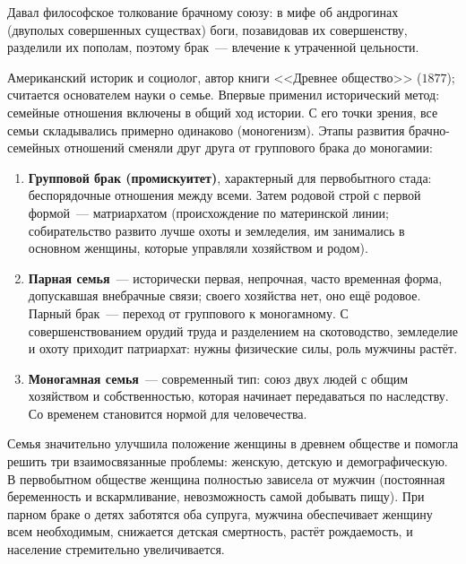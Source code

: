 \documentclass[12pt]{article}
\begin{document}
	\begin{person}[Платон]
		Давал философское толкование брачному союзу: в мифе об андрогинах (двуполых совершенных существах) боги, позавидовав их совершенству, разделили их пополам, поэтому брак~--- влечение к утраченной цельности.
	\end{person}

	\begin{person}
		Американский историк и социолог, автор книги <<Древнее общество>> ($1877$); считается основателем науки о семье. Впервые применил исторический метод: семейные отношения включены в общий ход истории. С его точки зрения, все семьи складывались примерно одинаково (моногенизм). Этапы развития брачно-семейных отношений сменяли друг друга от группового брака до моногамии:
		\begin{enumerate}
			\item \textbf{Групповой брак (промискуитет)}, характерный для первобытного стада: беспорядочные отношения между всеми. Затем родовой строй с первой формой~--- матриархатом (происхождение по материнской линии; собирательство развито лучше охоты и земледелия, им занимались в основном женщины, которые управляли хозяйством и родом).
			\item \textbf{Парная семья}~--- исторически первая, непрочная, часто временная форма, допускавшая внебрачные связи; своего хозяйства нет, оно ещё родовое. Парный брак~--- переход от группового к моногамному. С совершенствованием орудий труда и разделением на скотоводство, земледелие и охоту приходит патриархат: нужны физические силы, роль мужчины растёт.
			\item \textbf{Моногамная семья}~--- современный тип: союз двух людей с общим хозяйством и собственностью, которая начинает передаваться по наследству. Со временем становится нормой для человечества.
		\end{enumerate}
	\end{person}

	\begin{note}
		Семья значительно улучшила положение женщины в древнем обществе и помогла решить три взаимосвязанные проблемы: женскую, детскую и демографическую. В первобытном обществе женщина полностью зависела от мужчин (постоянная беременность и вскармливание, невозможность самой добывать пищу). При парном браке о детях заботятся оба супруга, мужчина обеспечивает женщину всем необходимым, снижается детская смертность, растёт рождаемость, и население стремительно увеличивается.
	\end{note}
\end{document}
